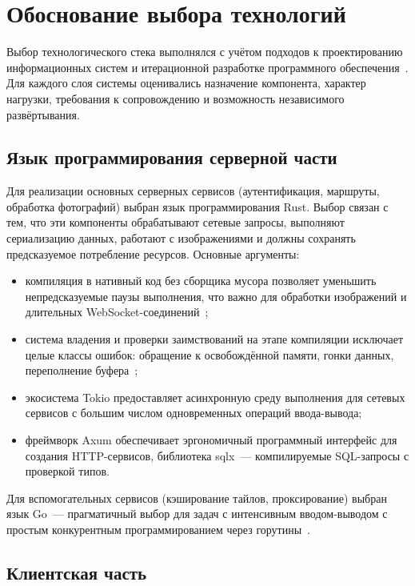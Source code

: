 \section{Обоснование выбора технологий}
\label{sec:tech-choice}

Выбор технологического стека выполнялся с учётом подходов к проектированию информационных систем и итерационной разработке программного обеспечения~\cite{vendrov2006,gagarina2020,jacobson2002}. Для каждого слоя системы оценивались назначение компонента, характер нагрузки, требования к сопровождению и возможность независимого развёртывания.

\subsection{Язык программирования серверной части}

Для реализации основных серверных сервисов (аутентификация, маршруты, обработка
фотографий) выбран язык программирования Rust. Выбор связан с тем, что эти
компоненты обрабатывают сетевые запросы, выполняют сериализацию данных,
работают с изображениями и должны сохранять предсказуемое потребление ресурсов.
Основные аргументы:

\begin{itemize}
  \item компиляция в нативный код без сборщика мусора позволяет уменьшить
    непредсказуемые паузы выполнения, что важно для обработки изображений и
    длительных WebSocket-соединений~\cite{blandy2021};
  \item система владения и проверки заимствований на этапе компиляции исключает целые классы ошибок: обращение к освобождённой памяти, гонки данных, переполнение буфера~\cite{rustbook};
  \item экосистема Tokio предоставляет асинхронную среду выполнения для сетевых
    сервисов с большим числом одновременных операций ввода-вывода;
  \item фреймворк Axum обеспечивает эргономичный программный интерфейс для создания HTTP-сервисов, библиотека sqlx~--- компилируемые SQL-запросы с проверкой типов.
\end{itemize}

Для вспомогательных сервисов (кэширование тайлов, проксирование) выбран язык Go~--- прагматичный выбор для задач с интенсивным вводом-выводом с простым конкурентным программированием через горутины~\cite{donovan2015}.

\subsection{Клиентская часть}

